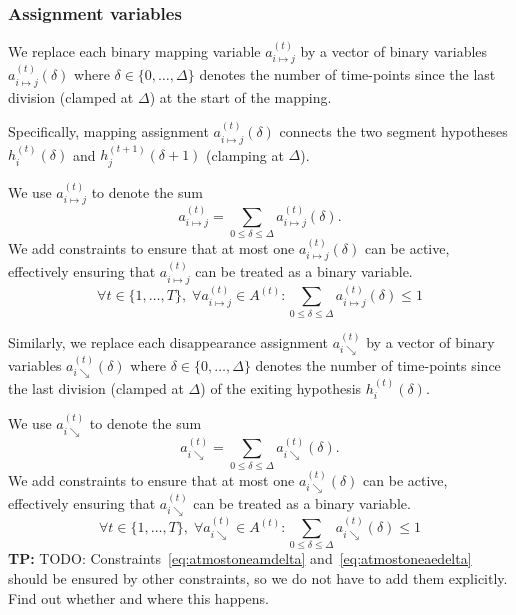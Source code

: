 \documentclass[a4paper]{article}
\newcommand{\TP}[1]{{\color{Red}\sc \textbf{TP:} #1}{}}
\newcommand{\set}[1]{\ensuremath{\{#1\}}}
\newcommand{\vhtid}[3][t]{\ensuremath{h^{(#1)}_{#2}\left({#3}\right)}\xspace}
\newcommand{\vaset}[1]{\ensuremath{A^{(#1)}}\xspace}
\newcommand{\At}[1][t]{\vaset{#1}}
\newcommand{\vam}[3]{\ensuremath{a^{(#1)}_{#2\mapsto#3}}\xspace}
\newcommand{\vamd}[4]{\ensuremath{a^{(#1)}_{#2\mapsto#3}\left(#4\right)}\xspace}
\newcommand{\vae}[2]{\ensuremath{a^{(#1)}_{#2\searrow}}\xspace}
\newcommand{\vaed}[3]{\ensuremath{a^{(#1)}_{#2\searrow}\left(#3\right)}\xspace}
\begin{document}
\subsubsection{Assignment variables}
%
\newcommand{\vamtij}{\vam{t}{i}{j}}
\newcommand{\vamtijd}[1][\delta]{\vamd{t}{i}{j}{#1}}
We replace each binary mapping variable \vamtij by a vector of binary variables \vamtijd where $\delta\in\set{0,\dots,\Delta}$ denotes the number of time-points since the last division (clamped at $\Delta$) at the start of the mapping.

Specifically, mapping assignment \vamtijd connects the two segment hypotheses \vhtid{i}{\delta} and \vhtid[t+1]{j}{\delta+1} (clamping at $\Delta$).

We use \vamtij to denote the sum
\begin{equation}
	\vamtij = \sum_{0 \leq \delta \leq \Delta} \vamtijd.
\end{equation}
We add constraints to ensure that at most one \vamtijd can be active, effectively ensuring that \vamtij can be treated as a binary variable.
\begin{equation}\label{eq:atmostoneamdelta}
  \forall t \in \set{1, \dots, T},\;
  \forall \vamtij \in \At:
		\sum_{0 \leq \delta \leq \Delta} \vamtijd
  	\leq 1
\end{equation}
%

\newcommand{\vaeti}{\vae{t}{i}}
\newcommand{\vaetid}[1][\delta]{\vaed{t}{i}{#1}}
\noindent
Similarly, we replace each disappearance assignment \vaeti by a vector of binary variables \vaetid where $\delta\in\set{0,\dots,\Delta}$ denotes the number of time-points since the last division (clamped at $\Delta$) of the exiting hypothesis \vhtid{i}{\delta}.

We use \vaeti to denote the sum
\begin{equation}
	\vaeti = \sum_{0 \leq \delta \leq \Delta} \vaetid.
\end{equation}
We add constraints to ensure that at most one \vaetid can be active, effectively ensuring that \vaeti can be treated as a binary variable.
\begin{equation}\label{eq:atmostoneaedelta}
  \forall t \in \set{1, \dots, T},\;
  \forall \vaeti \in \At:
		\sum_{0 \leq \delta \leq \Delta} \vaetid
  	\leq 1
\end{equation}
%
%
\TP{TODO: Constraints~\eqref{eq:atmostoneamdelta} and~\eqref{eq:atmostoneaedelta} should be ensured by other constraints, so we do not have to add them explicitly. Find out whether and where this happens.}
%
%
%
\end{document}
